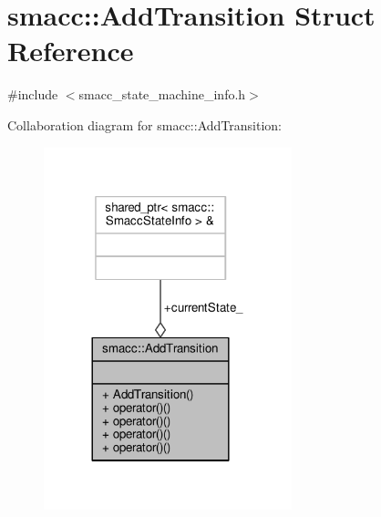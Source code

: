 \hypertarget{structsmacc_1_1AddTransition}{}\section{smacc\+:\+:Add\+Transition Struct Reference}
\label{structsmacc_1_1AddTransition}


{\ttfamily \#include $<$smacc\+\_\+state\+\_\+machine\+\_\+info.\+h$>$}



Collaboration diagram for smacc\+:\+:Add\+Transition\+:
\nopagebreak
\begin{figure}[H]
\begin{center}
\leavevmode
\includegraphics[width=204pt]{structsmacc_1_1AddTransition__coll__graph}
\end{center}
\end{figure}
